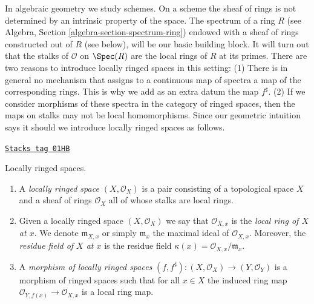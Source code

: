\medskip\noindent
In algebraic geometry we study schemes. On a scheme the sheaf of rings
is not determined by an intrinsic property of the space.
The spectrum of a ring $R$
(see Algebra, Section \ref{algebra-section-spectrum-ring}) endowed
with a sheaf of rings constructed out of $R$ (see below),
will be our basic building block. It will turn out that
the stalks of $\mathcal{O}$ on $\Spec(R)$ are the local
rings of $R$ at its primes. There are two reasons to introduce
locally ringed spaces in this setting: (1) There is in general
no mechanism that assigns to a continuous map of spectra a
map of the corresponding rings. This is why we add as an extra datum
the map $f^\sharp$. (2) If we consider morphisms
of these spectra in the category of ringed spaces, then the
maps on stalks may not be local homomorphisms. Since our
geometric intuition says it should we introduce locally ringed spaces
as follows.

\begin{definition}
\label{schemes-definition-locally-ringed-space}
\href{https://stacks.math.columbia.edu/tag/01HB}{\texttt{Stacks tag 01HB}}

Locally ringed spaces.
\begin{enumerate}
\item A {\it locally ringed space $(X, \mathcal{O}_X)$}
is a pair consisting of a
topological space $X$ and a sheaf of rings $\mathcal{O}_X$ all of whose stalks
are local rings.
\item Given a locally ringed space $(X, \mathcal{O}_X)$ we say that
$\mathcal{O}_{X, x}$ is the {\it local ring of $X$ at $x$}.
We denote $\mathfrak{m}_{X, x}$ or simply $\mathfrak{m}_x$
the maximal ideal of $\mathcal{O}_{X, x}$. Moreover, the
{\it residue field of $X$ at $x$} is the residue field
$\kappa(x) = \mathcal{O}_{X, x}/\mathfrak{m}_x$.
\item A {\it morphism of locally ringed spaces}
$(f, f^\sharp) : (X, \mathcal{O}_X) \to (Y, \mathcal{O}_Y)$
is a morphism of ringed spaces such that for all $x \in X$
the induced ring map $\mathcal{O}_{Y, f(x)} \to \mathcal{O}_{X, x}$ is a
local ring map.
\end{enumerate}
\end{definition}

